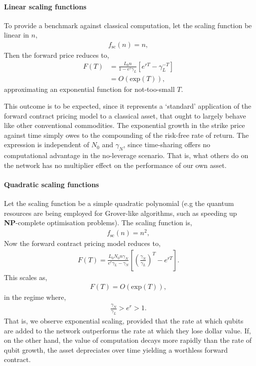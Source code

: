 \documentclass[aps, rmp, twocolumn, amsmath, amssymb, nofootinbib, superscriptaddress, longbibliography, floatfix, table-of-contents, eqsecnum]{revtex4-1}
\begin{document}
%
%

\paragraph{Linear scaling functions}

To provide a benchmark against classical computation, let the scaling function be linear in $n$,
\begin{align}
f_\text{sc}(n) = n,	
\end{align}
Then the forward price reduces to,
\begin{align}
F(T) &= \frac{L_0 n}{1-e^r\gamma_L} \left[e^{rT} - \gamma_L^{-T}\right] \nonumber \\
&= O(\text{exp}(T)),
\end{align}
approximating an exponential function for not-too-small $T$.

This outcome is to be expected, since it represents a `standard' application of the forward contract pricing model to a classical asset, that ought to largely behave like other conventional commodities. The exponential growth in the strike price against time simply owes to the compounding of the risk-free rate of return. The expression is independent of $N_0$ and $\gamma_N$, since time-sharing offers no computational advantage in the no-leverage scenario. That is, what others do on the network has no multiplier effect on the performance of our own asset.

%
%

\paragraph{Quadratic scaling functions}

Let the scaling function be a simple quadratic polynomial (e.g the quantum resources are being employed for Grover-like algorithms, such as speeding up \textbf{NP}-complete optimisation problems). The scaling function is,
\begin{align}
f_\text{sc}(n) = n^2,	
\end{align}
Now the forward contract pricing model reduces to,
\begin{align}
F(T) = \frac{L_0 N_0 n \gamma_N}{e^r\gamma_L-\gamma_N} \left[\left(\frac{\gamma_N}{\gamma_L}\right)^{T} - e^{rT}\right].
\end{align}
This scales as,
\begin{align}
	F(T)=O(\text{exp}(T)),
\end{align}
in the regime where,
\begin{align}
	\frac{\gamma_N}{\gamma_L} > e^r > 1.
\end{align}
That is, we observe exponential scaling, provided that the rate at which qubits are added to the network outperforms the rate at which they lose dollar value. If, on the other hand, the value of computation decays more rapidly than the rate of qubit growth, the asset depreciates over time yielding a worthless forward contract.
\end{document}
